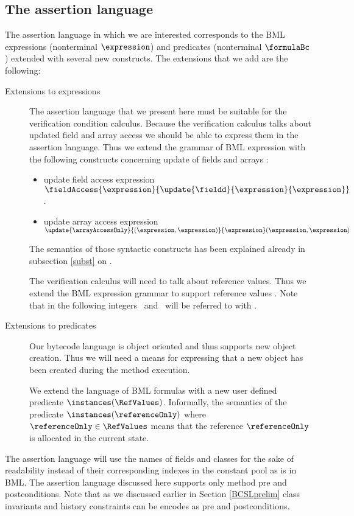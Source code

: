 \subsection{The assertion language} \label{assertLang:lang}
The assertion language in which we are interested corresponds to the
BML  expressions (nonterminal $\expression$) and predicates 
(nonterminal $\formulaBc$) extended with several new constructs.
 The extensions that we add are the following:
\begin{description}
    \item [Extensions to expressions] 
         The assertion language that we present here must be suitable for the verification condition calculus.
	 Because the verification calculus talks about updated field and array access
	 we should be able  to express  them in the assertion language. Thus we extend the grammar of BML expression
	 with the following constructs concerning update of fields and arrays :

        \begin{itemize}
	       \item update field access expression 
		  $\fieldAccess{\expression }{\update{\fieldd}{ \expression}{\expression}}$.
		 

	       \item update array access expression 
                   $ \update{ \arrayAccessOnly}{ (\expression , \expression)}{ \expression} (\expression,\expression)$
	\end{itemize}
         The semantics of those syntactic constructs has been explained already in subsection \ref{subst} on \pageref{subst}.

	The verification calculus will need to talk about reference values. Thus we extend the BML expression grammar to  support
	reference values \RefValues. Note that in the following integers \Myint\  and \RefValues \ will be referred to with \Values.
    \item [Extensions to predicates] Our bytecode language is object oriented and thus supports new object creation. Thus we
          will need a means for expressing that a new object has been created during the method execution. 

	  We extend the language of BML  formulas
	  with a new user defined predicate $ \instances(\RefValues)$. Informally, the semantics of the predicate
	  $\instances(\referenceOnly)$ where $\referenceOnly \in \RefValues$
	  means that the reference $\referenceOnly  $  is allocated in the current state.
        
\end{description}

The assertion language will use the names of fields and classes for the sake of readability instead of their corresponding indexes
in the constant pool as is in BML. 
The assertion language discussed here supports only method pre and postconditions. Note that as we discussed earlier in 
Section \ref{BCSLprelim}
class invariants and history constraints can be encodes as pre and postconditions. 
